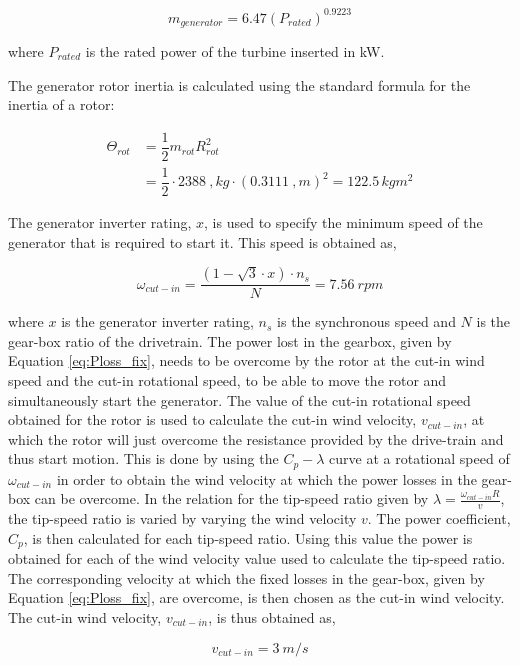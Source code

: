 \begin{equation}
    m_{generator} = 6.47 \left(P_{rated}\right)^{0.9223}
\end{equation}

where $P_{rated}$ is the rated power of the turbine inserted in kW. 

The generator rotor inertia is calculated using the standard formula for the inertia of a rotor: 

\begin{align}
\Theta_{rot} &= \dfrac{1}{2}m_{rot}R_{rot}^2 \\
&= \dfrac{1}{2}\cdot 2388\ ,kg \cdot (0.3111 \ ,m)^2 = 122.5 \, kgm^2 \nonumber
\end{align}

The generator inverter rating, $x$, is used to specify the minimum speed of the generator that is required to start it. This speed is obtained as,

\begin{equation}
    \omega_{cut-in} = \dfrac{(1- \sqrt{3}\cdot x)\cdot n_s}{N}= 7.56\ rpm
\label{eq:cut-in_speed}
\end{equation}

where $x$ is the generator inverter rating, $n_s$ is the synchronous speed and $N$ is the gear-box ratio of the drivetrain. 
The power lost in the gearbox, given by Equation \ref{eq:Ploss_fix}, needs to be overcome by the rotor at the cut-in wind speed and the cut-in rotational speed, to be able to move the rotor and simultaneously start the generator. The value of the cut-in rotational speed obtained for the rotor is used to calculate the cut-in wind velocity, $v_{cut-in}$, at which the rotor will just overcome the resistance provided by the drive-train and thus start motion. This is done by using the $C_p-\lambda$ curve at a rotational speed of $\omega_{cut-in}$ in order to obtain the wind velocity at which the power losses in the gear-box can be overcome.
In the relation for the tip-speed ratio given by $\lambda= \frac{\omega_{cut-in} R}{v}$, the tip-speed ratio is varied by varying the wind velocity $v$. The power coefficient, $C_p$, is then calculated for each tip-speed ratio. Using this value the power is obtained for each of the wind velocity value used to calculate the tip-speed ratio. The corresponding velocity at which the fixed losses in the gear-box, given by Equation \ref{eq:Ploss_fix}, are overcome, is then chosen as the cut-in wind velocity.
The cut-in wind velocity, $v_{cut-in}$, is thus obtained as,

\begin{equation}
    v_{cut-in} = 3\ m/s
\label{eq:cut-in_wind_vel}
\end{equation}





